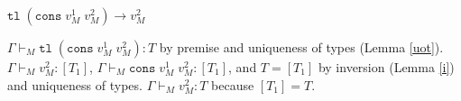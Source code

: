 \begin{case}
$\mathtt{tl}\;(\mathtt{cons}\;v_{M}^{1}\;v_{M}^{2})\rightarrow v_{M}^{2}$

$\Gamma\vdash_{M}\mathtt{tl}\;(\mathtt{cons}\;v_{M}^{1}\;v_{M}^{2}):T$ by premise and uniqueness of types (Lemma \ref{uot}).  $\Gamma\vdash_{M}v_{M}^{2}:[T_{1}]$, $\Gamma\vdash_{M}\mathtt{cons}\;v_{M}^{1}\;v_{M}^{2}:[T_{1}]$, and $T=[T_{1}]$ by inversion (Lemma \ref{i}) and uniqueness of types.  $\Gamma\vdash_{M}v_{M}^{2}:T$ because $[T_{1}]=T$.
\end{case}